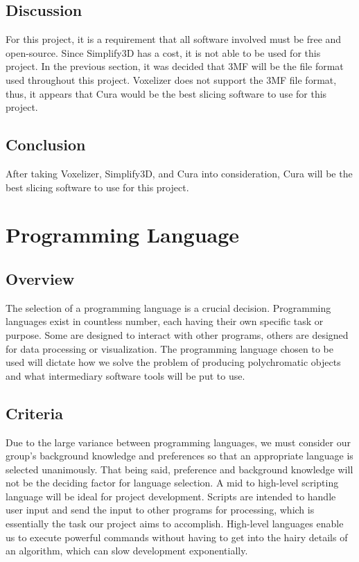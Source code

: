 \documentclass[letterpaper, onecolumn, draftclsnofoot, 10pt, compsoc]{IEEEtran}
\begin{document}
\begin{singlespace}
\subsection{Discussion}
For this project, it is a requirement that all software involved must be free and open-source.
Since Simplify3D has a cost, it is not able to be used for this project. 
In the previous section, it was decided that 3MF will be the file format used throughout this project. 
Voxelizer does not support the 3MF file format, thus, it appears that Cura would be the best slicing software to use for this project. 

\subsection{Conclusion}
After taking Voxelizer, Simplify3D, and Cura into consideration, Cura will be the best slicing software to use for this project.
\end{singlespace}

\section{Programming Language}
        \subsection{Overview}
                \begin{singlespace}
                The selection of a programming language is a crucial decision.
                Programming languages exist in countless number, each having their own specific task or purpose.
                Some are designed to interact with other programs, others are designed for data processing or visualization.
                The programming language chosen to be used will dictate how we solve the problem of producing polychromatic objects and what intermediary software tools will be put to use.
                \end{singlespace}
        \subsection{Criteria}
                \begin{singlespace}
                Due to the large variance between programming languages, we must consider our group's background knowledge and preferences so that an appropriate language is selected unanimously.
                That being said, preference and background knowledge will not be the deciding factor for language selection.
                A mid to high-level scripting language will be ideal for project development.
                Scripts are intended to handle user input and send the input to other programs for processing, which is essentially the task our project aims to accomplish.
                High-level languages enable us to execute powerful commands without having to get into the hairy details of an algorithm, which can slow development exponentially.
                \end{singlespace}
\end{document}
